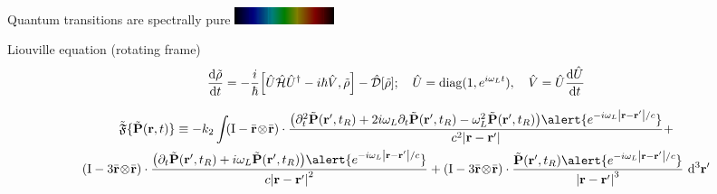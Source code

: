 \documentclass[aspectratio=169, usenames, dvipsnames]{beamer}
\newcommand{\oper}[1]{\mathcal{#1}}
\newcommand{\outerprod}[2]{#1 \! \otimes \! #2}
\begin{document}
\begin{frame}{Quantum transitions are spectrally pure}
  \includegraphics[width=\textwidth, height=0.5cm]{figures/Helium_spectrum_visible}
      \begin{block}{Liouville equation (rotating frame)}
        \begin{gather*}
          \dv{\tilde{\rho}}{t} = -\frac{i}{\hbar} \commutator{\hat{U}\hat{\oper{H}}\hat{U}^\dagger - i\hbar \hat{V}}{\tilde{\rho}} - \hat{\oper{D}}\qty[\tilde{\rho}]; \quad \hat{U} = \mathrm{diag}(1, e^{i \omega_L t}), \quad \hat{V} = \hat{U} \dv{\hat{U}}{t}
        \end{gather*}
      \end{block}

      \begin{gather*}
        \tilde{\mathfrak{F}}\{\tilde{\vb{P}}(\vb{r}, t) \} \equiv -k_2 \int_{}
        \qty(\mathrm{I} -  \outerprod{\bar{\vb{r}}}{\bar{\vb{r}}} ) \cdot \frac{\qty(\partial_t^2 \tilde{\vb{P}}(\vb{r}', t_R) + 2 i \omega_L \partial_t \tilde{\vb{P}}(\vb{r}', t_R) - \omega_L^2 \tilde{\vb{P}}(\vb{r}', t_R)) \alert{e^{-i \omega_L \abs{\vb{r} - \vb{r}'}/c}}}{c^2 \abs{\vb{r}-\vb{r}'}} + \\
        \qty(\mathrm{I} - 3\outerprod{\bar{\vb{r}}}{\bar{\vb{r}}} ) \cdot \frac{\qty(\partial_t \tilde{\vb{P}}(\vb{r}', t_R) + i \omega_L \tilde{\vb{P}}(\vb{r}', t_R))\alert{e^{-i \omega_L \abs{\vb{r} - \vb{r}'}/c}}}{c \abs{\vb{r}-\vb{r}'}^2} +
        \qty(\mathrm{I} - 3\outerprod{\bar{\vb{r}}}{\bar{\vb{r}}} ) \cdot \frac{                \tilde{\vb{P}}(\vb{r}', t_R) \alert{e^{-i \omega_L \abs{\vb{r} - \vb{r}'}/c}}}{\abs{\vb{r}-\vb{r}'}^3}
        \, \dd[3]{\vb{r'}}
      \end{gather*}
\end{frame}
\end{document}

